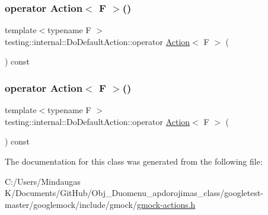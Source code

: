 \mbox{\label{classtesting_1_1internal_1_1_do_default_action_aea08828a0d64847e29ab7a5abeb74149}} 
\subsubsection{\texorpdfstring{operator Action$<$ F $>$()}{operator Action< F >()}\hspace{0.1cm}{\footnotesize\ttfamily [2/3]}}
{\footnotesize\ttfamily template$<$typename F $>$ \\
testing\+::internal\+::\+Do\+Default\+Action\+::operator \mbox{\hyperlink{classtesting_1_1_action}{Action}}$<$ F $>$ (\begin{DoxyParamCaption}{ }\end{DoxyParamCaption}) const\hspace{0.3cm}{\ttfamily [inline]}}

\mbox{\label{classtesting_1_1internal_1_1_do_default_action_aea08828a0d64847e29ab7a5abeb74149}} 
\subsubsection{\texorpdfstring{operator Action$<$ F $>$()}{operator Action< F >()}\hspace{0.1cm}{\footnotesize\ttfamily [3/3]}}
{\footnotesize\ttfamily template$<$typename F $>$ \\
testing\+::internal\+::\+Do\+Default\+Action\+::operator \mbox{\hyperlink{classtesting_1_1_action}{Action}}$<$ F $>$ (\begin{DoxyParamCaption}{ }\end{DoxyParamCaption}) const\hspace{0.3cm}{\ttfamily [inline]}}



The documentation for this class was generated from the following file\+:\begin{DoxyCompactItemize}
\item 
C\+:/\+Users/\+Mindaugas K/\+Documents/\+Git\+Hub/\+Obj\+\_\+\+Duomenu\+\_\+apdorojimas\+\_\+class/googletest-\/master/googlemock/include/gmock/\mbox{\hyperlink{googletest-master_2googlemock_2include_2gmock_2gmock-actions_8h}{gmock-\/actions.\+h}}\end{DoxyCompactItemize}
